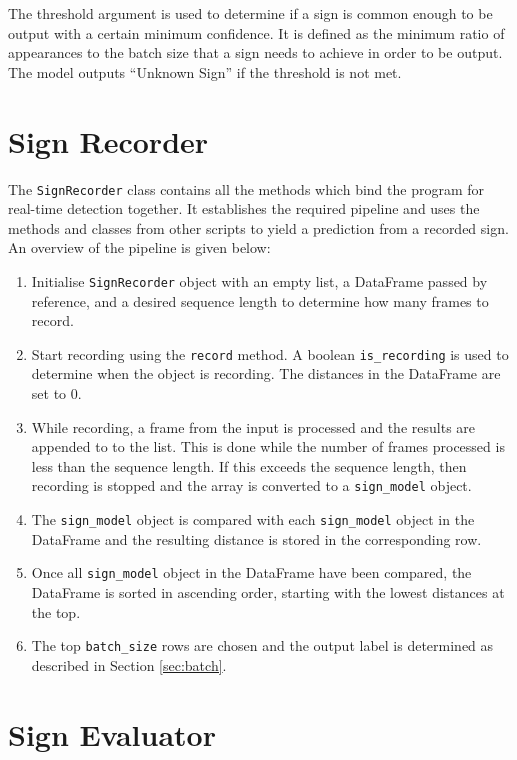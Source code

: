 \documentclass[final,rdr32.tex]{subfiles}
\begin{document}
The threshold argument is used to determine if a sign is common enough to be output with a certain minimum confidence. It is defined as the minimum ratio of appearances to the batch size that a sign needs to achieve in order to be output.
The model outputs ``Unknown Sign'' if the threshold is not met.

\section{Sign Recorder}
\label{sec:sign_recorder}

The \verb|SignRecorder| class contains all the methods which bind the program for real-time detection together. It establishes the required pipeline and uses the methods and classes from other scripts to yield a prediction from a recorded sign. An overview of the pipeline is given below:

\begin{enumerate}
    \item Initialise \verb|SignRecorder| object with an empty list, a DataFrame passed by reference, and a desired sequence length to determine how many frames to record.
    \item Start recording using the \verb|record| method. A boolean \verb|is_recording| is used to determine when the object is recording. The distances in the DataFrame are set to 0.
    \item While recording, a frame from the input is processed and the results are appended to to the list. This is done while the number of frames processed is less than the sequence length. If this exceeds the sequence length, then recording is stopped and the array is converted to a \verb|sign_model| object.
    \item The \verb|sign_model| object is compared with each \verb|sign_model| object in the DataFrame and the resulting distance is stored in the corresponding row.
    \item Once all \verb|sign_model| object in the DataFrame have been compared, the DataFrame is sorted in ascending order, starting with the lowest distances at the top.
    \item The top \verb|batch_size| rows are chosen and the output label is determined as described in Section \ref{sec:batch}.
\end{enumerate}

\section{Sign Evaluator}
\label{sec:sign_eval}
\end{document}
